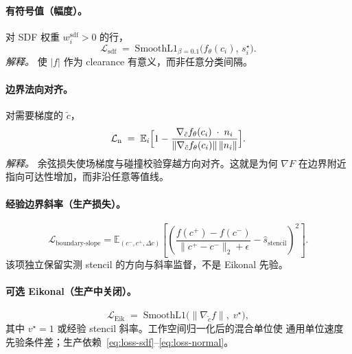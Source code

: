 \documentclass[UTF8,a4paper,11pt,fontset=fandol]{ctexart}
\begin{document}
\paragraph{有符号值（幅度）。}
对 SDF 权重 \(w_{i}^{\mathrm{sdf}}>0\) 的行，
\begin{equation}
\label{eq:loss-sdf}
  \mathcal{L}_{\mathrm{sdf}}
  \;=\;
  \mathrm{SmoothL1}_{\beta=0.1}
  \bigl(f_{\theta}(c_{i}),\, s_{i}^{\star}\bigr).
\end{equation}
\emph{解释。}
使 \(|f|\) 作为 clearance 有意义，而非任意分类间隔。

\paragraph{边界法向对齐。}
对需要梯度的 \(\tilde c\)，
\begin{equation}
\label{eq:loss-normal}
  \mathcal{L}_{\mathrm{n}}
  \;=\;
  \mathbb{E}_{i}\Bigl[
    1
    -
    \frac{
      \nabla_{\tilde c}f_{\theta}(c_{i})
      \;\cdot\;
      n_{i}
    }{
      \|\nabla_{\tilde c}f_{\theta}(c_{i})\|\,\|n_{i}\|
    }
  \Bigr].
\end{equation}
\emph{解释。}
余弦损失使场梯度与碰撞校验穿越方向对齐。这就是为何 \(\nabla F\)
在边界附近指向可达性增加，而非沿任意等值线。

\paragraph{经验边界斜率（生产损失）。}
\begin{equation}
\label{eq:loss-boundary-slope}
  \mathcal{L}_{\mathrm{boundary\text{-}slope}}
  = \mathbb{E}_{(c^-,c^+,\Delta c)}
    \left[\left(
      \frac{f(c^+)-f(c^-)}{\|c^+-c^-\|_2+\epsilon}
      - \widehat{s}_{\mathrm{stencil}}
    \right)^2\right].
\end{equation}
该项独立保留实测 stencil 的方向与斜率监督，不是 Eikonal 先验。

\paragraph{可选 Eikonal（生产中关闭）。}
\begin{equation}
\label{eq:loss-eikonal}
  \mathcal{L}_{\mathrm{Eik}}
  \;=\;
  \mathrm{SmoothL1}\bigl(
    \|\nabla_{\tilde c}f\|,\;
    v^{\star}
  \bigr),
\end{equation}
其中 \(v^{\star}=1\) 或经验 stencil 斜率。工作空间归一化后的混合单位使
通用单位速度先验条件差；生产依赖~\eqref{eq:loss-sdf}--\eqref{eq:loss-normal}。
\end{document}
